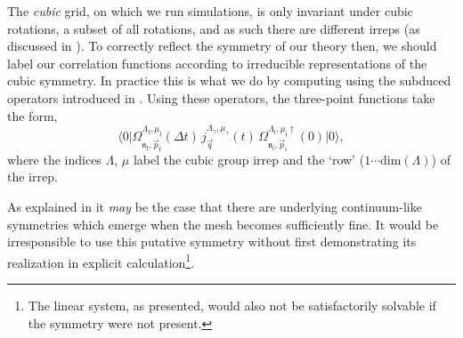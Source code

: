 The \emph{cubic} grid, on which we run simulations, is only invariant under cubic rotations, a subset of all rotations, and as such there are different irreps (as discussed in ). To correctly reflect the symmetry of our theory then, we should label our correlation functions according to irreducible representations of the cubic symmetry. In practice this is what we do by computing using the subduced operators introduced in . Using these operators, the three-point functions take the form,
\begin{equation}
	\big\langle 0 \big| \Omega_{\mathfrak{n}_\mathrm{f}, \vec{p}_\mathrm{f}}^{\Lambda_\mathrm{f},\mu_\mathrm{f}}(\Delta t) \, j_{\vec{q}}^{\Lambda_\gamma, \mu_\gamma}(t) \, \Omega_{\mathfrak{n}_\mathrm{i}, \vec{p}_\mathrm{i}}^{\Lambda_\mathrm{i},\mu_\mathrm{i}\dag}(0) \big| 0 \big\rangle, \label{subduced_3pt}
\end{equation}
where the indices $\Lambda$, $\mu$ label the cubic group irrep and the `row' ($1\cdots\text{dim}(\Lambda)$) of the irrep. 

As explained in  it \emph{may} be the case that there are underlying continuum-like symmetries which emerge when the mesh becomes sufficiently fine.  It would be irresponsible to use this putative symmetry without first demonstrating its realization in explicit calculation\footnote{The linear system, as presented, would also not be satisfactorily solvable if the symmetry were not present.}. 



